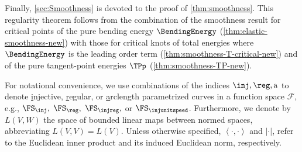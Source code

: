 Finally, \cref{sec:Smoothness} is devoted to the proof of \cref{thm:smoothness}. 
This regularity theorem follows from the combination of the smoothness result for critical points of the pure bending energy $ \BendingEnergy $ (\cref{thm:elastic-smoothness-new}) with those for critical knots of total energies where $ \BendingEnergy $ is the leading order term (\cref{thm:smoothness-T-critical-new}) and of the pure tangent-point energies $ \TPp $ (\cref{thm:smoothness-TP-new}). 

For notational convenience, we use combinations of the indices $\inj,\reg,\mathrm{a}$ to denote \underline{i}njective,
\underline{r}egular, or \underline{a}rclength parametrized
curves in a function space 
$\mathscr{F}$, e.g., $\FS_\inj,$ $\FS_\reg,$ $\FS_\injreg, $
or $\FS_\injunitspeed$.
Furthermore, we denote by $ L(V,W) $ the space of bounded linear maps between normed spaces, abbreviating $ L(V,V)=L(V) $. Unless otherwise specified, $ \left\langle \cdot,\cdot \right\rangle  $ and $ \left|\cdot \right| $, refer to the Euclidean inner product and its induced Euclidean norm, respectively.



